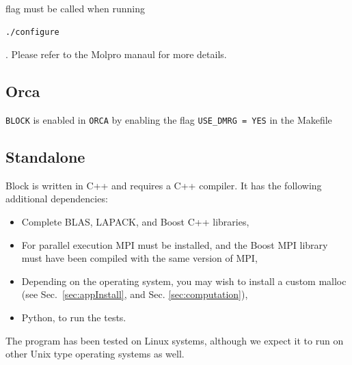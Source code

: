 \documentclass[letterpaper,12pt,aps, pra]{revtex4-1}
\begin{document}
flag must be called when running \begin{verbatim}./configure\end{verbatim}. Please refer to the Molpro manaul for more details.

\subsection{Orca}

\texttt{BLOCK} is enabled in \texttt{ORCA} by enabling the flag \texttt{USE\_DMRG = YES} in the Makefile

\subsection{Standalone}
Block is written in C++ and requires a C++ compiler. It has the following additional dependencies:
\begin{itemize}
\item Complete BLAS, LAPACK, and Boost C++ libraries,
\item For parallel execution MPI must be installed, and the Boost MPI library must have been compiled with the same version of MPI,
\item Depending on the operating system, you may wish to install a custom malloc (see Sec.~\ref{sec:appInstall}, and Sec. \ref{sec:computation}),
\item Python, to run the tests.
\end{itemize}
The program has been tested on Linux systems, although we expect it to run on other Unix type operating systems as well. 

\end{document}
